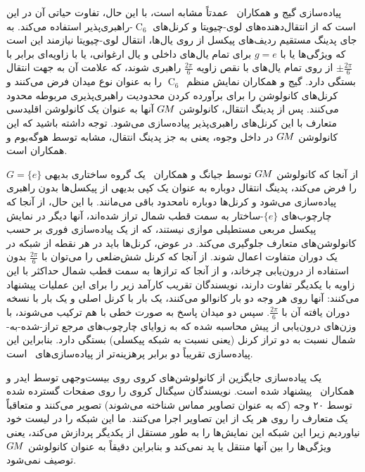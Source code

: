 پیاده‌سازی گیج و همکاران~\cite{gaugeIco2019} عمدتاً مشابه است، با این حال، تفاوت حیاتی آن در این است که از انتقال‌دهنده‌های لوی-چیویتا و کرنل‌های $\operatorname{C}_6$-راهبری‌پذیر استفاده می‌کند.
به جای پدینگ مستقیم ردیف‌های پیکسل از روی یال‌ها، انتقال لوی-چیویتا نیازمند این است که ویژگی‌ها یا با $g=e$ برای تمام یال‌های داخلی و یال ارغوانی، یا با زاویه‌ای برابر با $\pm\frac{2\pi}{6}$ از روی تمام یال‌های با نقص زاویه $\frac{2\pi}{6}$ راهبری شوند، که علامت آن به جهت انتقال بستگی دارد.
گیج و همکاران\cite{gaugeIco2019} نمایش منظم~$\operatorname{C}_6$ را به عنوان نوع میدان فرض می‌کنند و کرنل‌های کانولوشن را برای برآورده کردن محدودیت راهبری‌پذیری مربوطه محدود می‌کنند.
پس از پدینگ انتقال، کانولوشن $G\mkern-1.4muM$ آنها به عنوان یک کانولوشن اقلیدسی متعارف با این کرنل‌های راهبری‌پذیر پیاده‌سازی می‌شود.
توجه داشته باشید که این کانولوشن $G\mkern-1.4muM$ در داخل وجوه، یعنی به جز پدینگ انتقال، مشابه  توسط هوگه‌بوم و همکاران\cite{Hoogeboom2018-HEX} است.


از آنجا که کانولوشن $G\mkern-1.4muM$ توسط جیانگ و همکاران~\cite{zhang2019orientation} یک گروه ساختاری بدیهی $G=\{e\}$ را فرض می‌کند، پدینگ انتقال دوباره به عنوان یک کپی بدیهی از پیکسل‌ها بدون راهبری پیاده‌سازی می‌شود و کرنل‌ها دوباره نامحدود باقی می‌مانند.
با این حال، از آنجا که چارچوب‌های $\{e\}$-ساختار به سمت قطب شمال تراز شده‌اند، آنها دیگر در نمایش پیکسل مربعی مستطیلی موازی نیستند، که از یک پیاده‌سازی فوری بر حسب کانولوشن‌های متعارف جلوگیری می‌کند.
در عوض، کرنل‌ها باید در هر نقطه از شبکه در یک دوران متفاوت اعمال شوند.
از آنجا که کرنل شش‌ضلعی را می‌توان با $\frac{2\pi}{6}$ بدون استفاده از درون‌یابی چرخاند، و از آنجا که ترازها به سمت قطب شمال حداکثر با این زاویه با یکدیگر تفاوت دارند، نویسندگان تقریب کارآمد زیر را برای این عملیات پیشنهاد می‌کنند:
آنها روی هر وجه دو بار کانوالو می‌کنند، یک بار با کرنل اصلی و یک بار با نسخه دوران یافته آن با $\frac{2\pi}{6}$.
سپس دو میدان پاسخ به صورت خطی با هم ترکیب می‌شوند، با وزن‌های درون‌یابی از پیش محاسبه شده که به زوایای چارچوب‌های مرجع تراز-شده-به-شمال نسبت به دو تراز کرنل (یعنی نسبت به شبکه پیکسلی) بستگی دارد.
بنابراین این پیاده‌سازی تقریباً دو برابر پرهزینه‌تر از پیاده‌سازی‌های~\cite{liu2018icoAltAz,gaugeIco2019} است.


یک پیاده‌سازی جایگزین از کانولوشن‌های کروی روی بیست‌وجهی توسط ایدر و همکاران~\cite{eder2020tangent} پیشنهاد شده است.
نویسندگان سیگنال کروی را روی صفحات گسترده شده توسط ۲۰ وجه (که به عنوان تصاویر مماس شناخته می‌شوند) تصویر می‌کنند و متعاقباً یک  متعارف را روی هر یک از این تصاویر اجرا می‌کنند.
ما این شبکه را در لیست خود نیاوردیم زیرا این شبکه این نمایش‌ها را به طور مستقل از یکدیگر پردازش می‌کند، یعنی ویژگی‌ها را بین آنها منتقل یا پد نمی‌کند و بنابراین دقیقاً به عنوان کانولوشن $G\mkern-1.4muM$ توصیف نمی‌شود.


